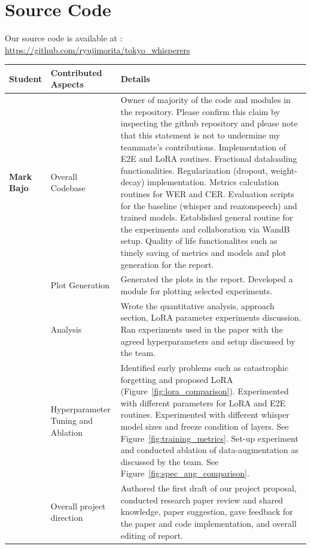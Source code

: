 \documentclass[10pt,twocolumn,letterpaper]{article}
\begin{document}
\section{Source Code}
\raggedright
Our source code is available at :
\href{https://github.com/ryujimorita/tokyo_whisperers}{https://github.com/ryujimorita/tokyo\_whisperers}



\clearpage

\begin{table} \small%
\renewcommand{\arraystretch}{0.9}
\begin{tabular}{|p{2cm}|p{2.9cm}|p{13cm}|}
\hline
\textbf{Student} & \textbf{Contributed Aspects} & \textbf{Details}  \\
\hline
\textbf{Mark Bajo} & Overall Codebase & Owner of majority of the code and modules in the repository. Please confirm this claim by inspecting the github repository and please note that this statement is not to undermine my teammate's contributions. Implementation of E2E and LoRA routines. Fractional dataloading functionalities. Regularization (dropout, weight-decay) implementation. Metrics calculation routines for WER and CER. Evaluation scripts for the baseline (whisper and reazonspeech) and trained models. Established general routine for the experiments and collaboration via WandB setup. Quality of life functionalites such as timely saving of metrics and models and plot generation for the report. \\
\cline{2-3} & Plot Generation & Generated the plots in the report. Developed a module for plotting selected experiments. \\
\cline{2-3} & Analysis & Wrote the quantitative analysis, approach section, LoRA parameter experiments discussion. Ran experiments used in the paper with the agreed hyperparameters and setup discussed by the team. \\
\cline{2-3} & Hyperparameter Tuning and Ablation & Identified early problems such as catastrophic forgetting and proposed LoRA (Figure~\ref{fig:lora_comparison}). Experimented with different parameters for LoRA and E2E routines. Experimented with different whisper model sizes and freeze condition of layers. See Figure~\ref{fig:training_metrics}. Set-up experiment and conducted ablation of data-augmentation as discussed by the team. See Figure~\ref{fig:spec_aug_comparison}. \\
\cline{2-3} & Overall project direction & Authored the first draft of our project proposal, conducted research paper review and shared knowledge, paper suggestion, gave feedback for the paper and code implementation, and overall editing of report. \\

\end{tabular}
\end{table}
\end{document}
